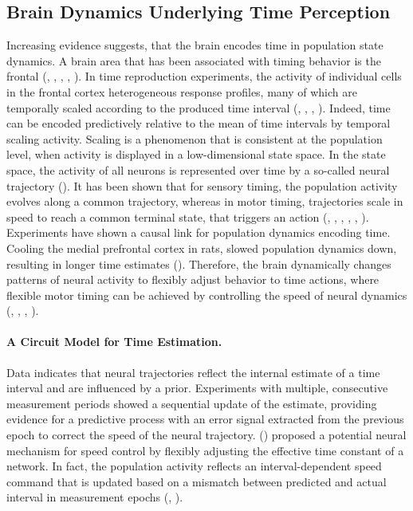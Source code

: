 \documentclass[10pt]{article}
\begin{document}
\subsection{Brain Dynamics Underlying Time Perception}
Increasing evidence suggests, that the brain encodes time in population state dynamics. 
A brain area that has been associated with timing behavior is the frontal (\cite{Shima2000}, \cite{Lewis2004}, \cite{Genovesio2006}, \cite{Emmons2017}, \cite{Wang2018}).
In time reproduction experiments, the activity of individual cells in the frontal cortex heterogeneous response profiles, many of which are temporally scaled according to the produced time interval (\cite{Henke2021}, \cite{Sohn2019}, \cite{Remington2018}, \cite{Wang2018}).
Indeed, time can be encoded predictively relative to the mean of time intervals by temporal scaling activity.
Scaling is a phenomenon that is consistent at the population level, when activity is displayed in a low-dimensional state space. In the state space, the activity of all neurons is represented over time by a so-called neural trajectory (\cite{Cueva2022}).
It has been shown that for sensory timing, the population activity evolves along a common trajectory, whereas in motor timing, trajectories scale in speed to reach a common terminal state, that triggers an action (\cite{Mita2009}, \cite{Murakami2014}, \cite{Wang2018}, \cite{Sohn2019}, \cite{Henke2021}, \cite{Meirhaeghe2021}).
Experiments have shown a causal link for population dynamics encoding time. Cooling the  medial prefrontal cortex in rats, slowed population dynamics down, resulting in longer time estimates (\cite{Xu2014}). 
Therefore, the brain dynamically changes patterns of neural activity to flexibly adjust behavior to time actions, where flexible motor timing can be achieved by controlling the speed of neural dynamics (\cite{Remington2018}, \cite{Wang2018}, \cite{Sohn2019}, \cite{Tsao2022}).

\paragraph{A Circuit Model for Time Estimation.}
Data indicates that neural trajectories reflect the internal estimate of a time interval and are influenced by a prior.
Experiments with multiple, consecutive measurement periods showed a sequential update of the estimate, providing evidence for a predictive process with an error signal extracted from the previous epoch to correct the speed of the neural trajectory.
\citeauthor{Wang2018} (\citeyear{Wang2018}) proposed a potential neural mechanism for speed control by flexibly adjusting the effective time constant of a network.
In fact, the population activity reflects an interval-dependent speed command that is updated based on a mismatch between predicted and actual interval in measurement epochs (\cite{Wang2018}, \cite{Egger2019}). 
\end{document}
